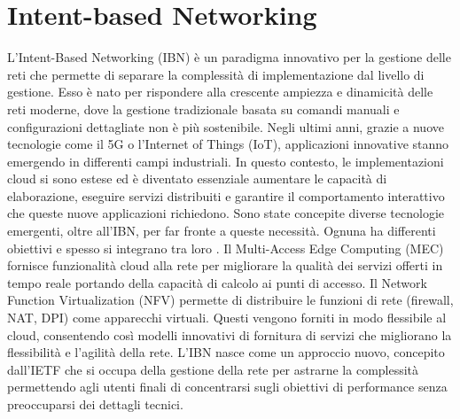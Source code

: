 \section{Intent-based Networking}
\label{ch:IBN}
L'Intent-Based Networking (IBN) è un paradigma innovativo per la gestione delle reti che permette di separare la complessità di implementazione dal livello di gestione.
Esso è nato per rispondere alla crescente ampiezza e dinamicità delle reti moderne, dove la gestione tradizionale basata su comandi manuali e configurazioni dettagliate non è più sostenibile.
Negli ultimi anni, grazie a nuove tecnologie come il 5G o l'Internet of Things (IoT), applicazioni innovative stanno emergendo in differenti campi industriali.
\newline In questo contesto, le implementazioni cloud si sono estese ed è diventato essenziale aumentare le capacità di elaborazione, eseguire servizi distribuiti e garantire il 
comportamento interattivo che queste nuove applicazioni richiedono.
\newline Sono state concepite diverse tecnologie emergenti, oltre all'IBN, per far fronte a queste necessità. Ognuna ha differenti obiettivi e spesso si integrano tra loro \cite{ibn}.
\newline Il Multi-Access Edge Computing\cite{mec} (MEC) fornisce funzionalità cloud alla rete per migliorare la qualità dei servizi offerti in tempo reale portando della capacità di calcolo ai punti di accesso.
\newline Il Network Function Virtualization\cite{nfv} (NFV) permette di distribuire le funzioni di rete (firewall, NAT, DPI) come apparecchi virtuali. Questi vengono forniti in modo flessibile al cloud, consentendo 
così modelli innovativi di fornitura di servizi che migliorano la flessibilità e l'agilità della rete.
\newline L'IBN nasce come un approccio nuovo, concepito dall'IETF \cite{ietf} che si occupa della gestione della rete per astrarne la complessità permettendo agli utenti finali di concentrarsi sugli obiettivi di performance senza preoccuparsi dei dettagli tecnici.
